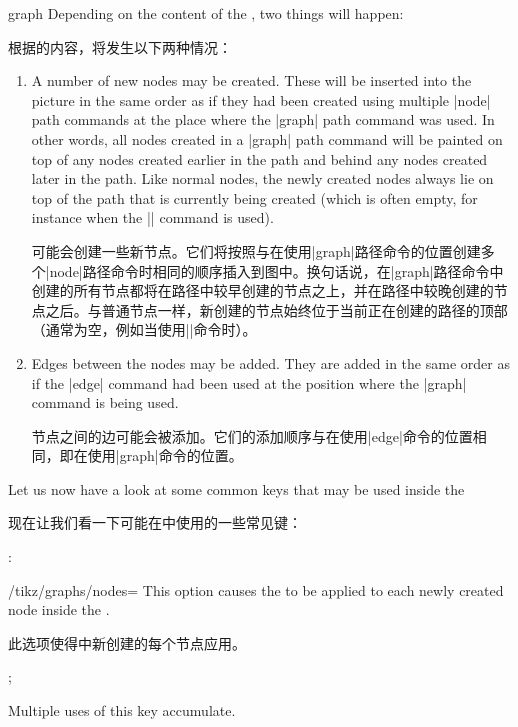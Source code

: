 \begin{pathoperation}{graph}{}
    Depending on the content of the , two things will
    happen:

    根据的内容，将发生以下两种情况：


    \begin{enumerate}
        \item A number of new nodes may be created. These will be inserted into
            the picture in the same order as if they had been created using
            multiple |node| path commands at the place where the |graph| path
            command was used. In other words, all nodes created in a |graph|
            path command will be painted on top of any nodes created earlier in
            the path and behind any nodes created later in the path. Like
            normal nodes, the newly created nodes always lie on top of the path
            that is currently being created (which is often empty, for instance
            when the |\graph| command is used).

            可能会创建一些新节点。它们将按照与在使用|graph|路径命令的位置创建多个|node|路径命令时相同的顺序插入到图中。换句话说，在|graph|路径命令中创建的所有节点都将在路径中较早创建的节点之上，并在路径中较晚创建的节点之后。与普通节点一样，新创建的节点始终位于当前正在创建的路径的顶部（通常为空，例如当使用|\graph|命令时）。


        \item Edges between the nodes may be added. They are added in the same
            order as if the |edge| command had been used at the position where
            the |graph| command is being used.

            节点之间的边可能会被添加。它们的添加顺序与在使用|edge|命令的位置相同，即在使用|graph|命令的位置。
    \end{enumerate}

    Let us now have a look at some common keys that may be used inside the

    现在让我们看一下可能在中使用的一些常见键：


    :
    \begin{key}{/tikz/graphs/nodes=}
        This option causes the  to be applied to each newly
        created node inside the .
        
        此选项使得中新创建的每个节点应用。
%
\begin{codeexample}[preamble={\usetikzlibrary{graphs}}]
\tikz {};
\end{codeexample}
        Multiple uses of this key accumulate.


\end{key}
\end{pathoperation}

